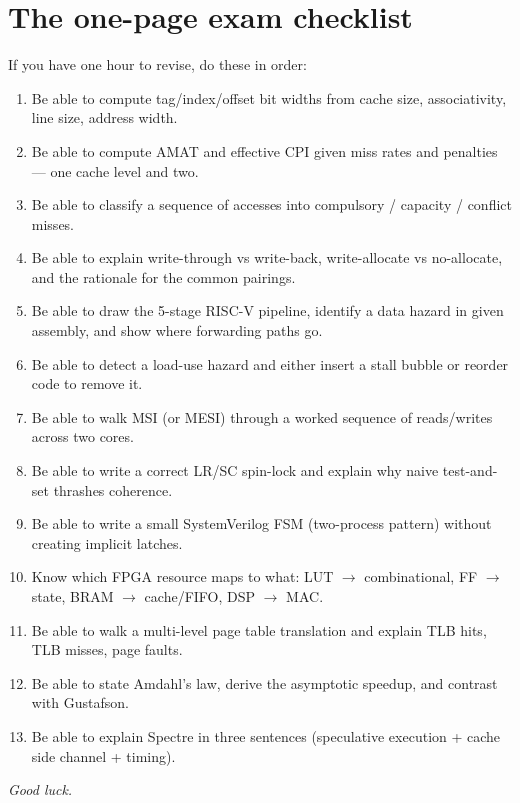 \documentclass[11pt,a4paper]{article}
\begin{document}
\hrulefill

\section{The one-page exam checklist}

\begin{must}
If you have one hour to revise, do these in order:
\begin{enumerate}[leftmargin=*,itemsep=2pt]
  \item Be able to compute tag/index/offset bit widths from cache size, associativity, line size, address width.
  \item Be able to compute AMAT and effective CPI given miss rates and penalties --- one cache level and two.
  \item Be able to classify a sequence of accesses into compulsory / capacity / conflict misses.
  \item Be able to explain write-through vs write-back, write-allocate vs no-allocate, and the rationale for the common pairings.
  \item Be able to draw the 5-stage RISC-V pipeline, identify a data hazard in given assembly, and show where forwarding paths go.
  \item Be able to detect a load-use hazard and either insert a stall bubble or reorder code to remove it.
  \item Be able to walk MSI (or MESI) through a worked sequence of reads/writes across two cores.
  \item Be able to write a correct LR/SC spin-lock and explain why naive test-and-set thrashes coherence.
  \item Be able to write a small SystemVerilog FSM (two-process pattern) without creating implicit latches.
  \item Know which FPGA resource maps to what: LUT $\rightarrow$ combinational, FF $\rightarrow$ state, BRAM $\rightarrow$ cache/FIFO, DSP $\rightarrow$ MAC.
  \item Be able to walk a multi-level page table translation and explain TLB hits, TLB misses, page faults.
  \item Be able to state Amdahl's law, derive the asymptotic speedup, and contrast with Gustafson.
  \item Be able to explain Spectre in three sentences (speculative execution + cache side channel + timing).
\end{enumerate}
\end{must}

\vspace{0.4cm}
\begin{center}
\textit{Good luck.}
\end{center}
\end{document}
